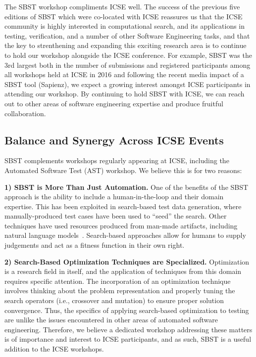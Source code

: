 \documentclass[10pt,conference]{IEEEtran}
\begin{document}
The SBST workshop compliments ICSE well. The success of the previous
five editions of SBST which were co-located with ICSE reassures us
that the ICSE community is highly interested in computational search,
and its applications in testing, verification, and a number of other
Software Engineering tasks, and that the key to strenthening and
expanding this exciting research area is to continue to hold our
workshop alongside the ICSE conference. For example, SBST was the 3rd
largest both in the number of submissions and registered participants
among all workshops held at ICSE in 2016 and following the recent
media impact of a SBST tool (Sapienz), we expect a growing interest
amongst ICSE participants in attending our workshop.  By continuing to
hold SBST with ICSE, we can reach out to other areas of software
engineering expertise and produce fruitful collaboration.


\subsection{Balance and Synergy Across ICSE Events}
\label{sec:balance-icse}

SBST complements workshops regularly appearing at ICSE, including the
Automated Software Test (AST) workshop.  We believe this is for two
reasons:

{\bf 1) SBST is More Than Just Automation.}  One of the benefits of
the SBST approach is the ability to include a human-in-the-loop and
their domain expertise.  This has been exploited in search-based test
data generation, where manually-produced test cases have been used to
``seed'' the search.  Other techniques have used resources produced
from man-made artifacts, including natural language
models~\cite{Afshan2013}.  Search-based approaches allow for humans to
supply judgements and act as a fitness function in their own
right. %

{\bf 2) Search-Based Optimization Techniques are Specialized.}
Optimization is a research field in itself, and the application of
techniques from this domain requires specific attention.  The
incorporation of an optimization technique involves thinking about the
problem representation and properly tuning the search operators (i.e.,
crossover and mutation) to ensure proper solution convergence.  Thus,
the specifics of applying search-based optimization to testing are
unlike the issues encountered in other areas of automated software
engineering. Therefore, we believe a dedicated workshop addressing
these matters is of importance and interest to ICSE participants, and
as such, SBST is a useful addition to the ICSE workshops.
\end{document}
